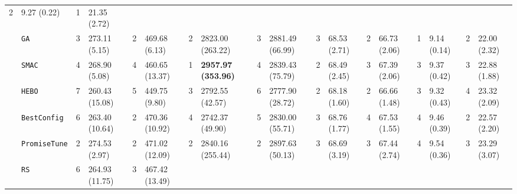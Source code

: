 \begin{tabular}{clllllllllllllllll}
  2 &
  \multicolumn{1}{l|}{9.27 (0.22)} &
  \cellcolor{blue!15}1 &
  \cellcolor{blue!15}21.35 (2.72) \\
\multicolumn{1}{c|}{} &
  \multicolumn{1}{l|}{\texttt{GA}} &
  3 &
  \multicolumn{1}{l|}{273.11 (5.15)} &
  2 &
  \multicolumn{1}{l|}{469.68 (6.13)} &
  2 &
  \multicolumn{1}{l|}{2823.00 (263.22)} &
  3 &
  \multicolumn{1}{l|}{2881.49 (66.99)} &
  3 &
  \multicolumn{1}{l|}{68.53 (2.71)} &
  2 &
  \multicolumn{1}{l|}{66.73 (2.06)} &
  \cellcolor{blue!15}1 &
  \multicolumn{1}{l|}{\cellcolor{blue!15}9.14 (0.14)} &
  2 &
  22.00 (2.32) \\
\multicolumn{1}{c|}{} &
  \multicolumn{1}{l|}{\texttt{SMAC}} &
  4 &
  \multicolumn{1}{l|}{268.90 (5.08)} &
  4 &
  \multicolumn{1}{l|}{460.65 (13.37)} &
  \cellcolor{blue!15}1 &
  \multicolumn{1}{l|}{\cellcolor{blue!15}\textbf{2957.97 (353.96)}} &
  4 &
  \multicolumn{1}{l|}{2839.43 (75.79)} &
  2 &
  \multicolumn{1}{l|}{68.49 (2.45)} &
  3 &
  \multicolumn{1}{l|}{67.39 (2.06)} &
  3 &
  \multicolumn{1}{l|}{9.37 (0.42)} &
  3 &
  22.88 (1.88) \\
\multicolumn{1}{c|}{} &
  \multicolumn{1}{l|}{\texttt{HEBO}} &
  7 &
  \multicolumn{1}{l|}{260.43 (15.08)} &
  5 &
  \multicolumn{1}{l|}{449.75 (9.80)} &
  3 &
  \multicolumn{1}{l|}{2792.55 (42.57)} &
  6 &
  \multicolumn{1}{l|}{2777.90 (28.72)} &
  2 &
  \multicolumn{1}{l|}{68.18 (1.60)} &
  2 &
  \multicolumn{1}{l|}{66.66 (1.48)} &
  3 &
  \multicolumn{1}{l|}{9.32 (0.43)} &
  4 &
  23.32 (2.09) \\
\multicolumn{1}{c|}{} &
  \multicolumn{1}{l|}{\texttt{BestConfig}} &
  6 &
  \multicolumn{1}{l|}{263.40 (10.64)} &
  2 &
  \multicolumn{1}{l|}{470.36 (10.92)} &
  4 &
  \multicolumn{1}{l|}{2742.37 (49.90)} &
  5 &
  \multicolumn{1}{l|}{2830.00 (55.71)} &
  3 &
  \multicolumn{1}{l|}{68.76 (1.77)} &
  4 &
  \multicolumn{1}{l|}{67.53 (1.55)} &
  4 &
  \multicolumn{1}{l|}{9.46 (0.39)} &
  2 &
  22.57 (2.20) \\
\multicolumn{1}{c|}{} &
  \multicolumn{1}{l|}{\texttt{PromiseTune}} &
  2 &
  \multicolumn{1}{l|}{274.53 (2.97)} &
  2 &
  \multicolumn{1}{l|}{471.02 (12.09)} &
  2 &
  \multicolumn{1}{l|}{2840.16 (255.44)} &
  2 &
  \multicolumn{1}{l|}{2897.63 (50.13)} &
  3 &
  \multicolumn{1}{l|}{68.69 (3.19)} &
  3 &
  \multicolumn{1}{l|}{67.44 (2.74)} &
  4 &
  \multicolumn{1}{l|}{9.54 (0.36)} &
  3 &
  23.29 (3.07) \\
\multicolumn{1}{c|}{} &
  \multicolumn{1}{l|}{\texttt{RS}} &
  6 &
  \multicolumn{1}{l|}{264.93 (11.75)} &
  3 &
  \multicolumn{1}{l|}{467.42 (13.49)} &

\end{tabular}
